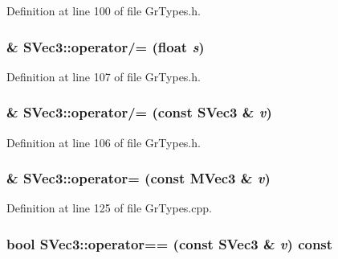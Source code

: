 Definition at line 100 of file GrTypes.h.\hypertarget{struct_s_vec3_270fb17ebc3651f2761e9ddd294e9e2d}{
\subsubsection[{operator/=}]{\& SVec3::operator/= (float {\em s})}}
\label{struct_s_vec3_270fb17ebc3651f2761e9ddd294e9e2d}




Definition at line 107 of file GrTypes.h.\hypertarget{struct_s_vec3_9e47ed7dcdb8436f298025c3cdc8f75a}{
\subsubsection[{operator/=}]{\& SVec3::operator/= (const {\bf SVec3} \& {\em v})}}
\label{struct_s_vec3_9e47ed7dcdb8436f298025c3cdc8f75a}




Definition at line 106 of file GrTypes.h.\hypertarget{struct_s_vec3_b50fa495fe66a74dfae638077e0bc850}{
\subsubsection[{operator=}]{ \& SVec3::operator= (const {\bf MVec3} \& {\em v})}}
\label{struct_s_vec3_b50fa495fe66a74dfae638077e0bc850}




Definition at line 125 of file GrTypes.cpp.\hypertarget{struct_s_vec3_562f164e2c990dc5e870942b82e11004}{
\subsubsection[{operator==}]{\setlength{\rightskip}{0pt plus 5cm}bool SVec3::operator== (const {\bf SVec3} \& {\em v}) const}}
\label{struct_s_vec3_562f164e2c990dc5e870942b82e11004}




